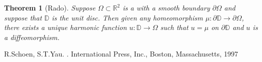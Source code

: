 \documentclass[12pt]{article}
\theoremstyle{theorem}
\newtheorem*{thm}{Theorem}
\theoremstyle{definition}
\begin{document}
\begin{thm}[Rado]
Suppose $\Omega \subset {\mathbb{R}}^2$ is a   with a smooth boundary $\partial \Omega$ and suppose that ${\mathbb{D}}$ is the unit disc.  Then given any homeomorphism $\mu : \partial {\mathbb{D}} \rightarrow \partial \Omega$, there exists a unique harmonic function $u : {\mathbb{D}} \rightarrow \Omega$ such that $u = \mu$ on $\partial {\mathbb{D}}$ and $u$ is a diffeomorphism.
\end{thm}

\begin{thebibliography}{9}
R.\@ Schoen, S.\@ T.\@ Yau.  \emph{}.  International Press, Inc., Boston, Massachusetts, 1997
\end{thebibliography}
\end{document}
